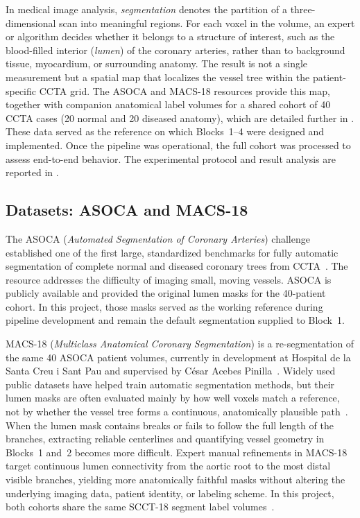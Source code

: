 In medical image analysis, \emph{segmentation} denotes the partition of a three-dimensional scan into meaningful regions. For each voxel in the volume, an expert or algorithm decides whether it belongs to a structure of interest, such as the blood-filled interior (\emph{lumen}) of the coronary arteries, rather than to background tissue, myocardium, or surrounding anatomy. The result is not a single measurement but a spatial map that localizes the vessel tree within the patient-specific CCTA grid. The ASOCA and MACS-18 resources provide this map, together with companion anatomical label volumes for a shared cohort of 40 CCTA cases (20 normal and 20 diseased anatomy), which are detailed further in . These data served as the reference on which Blocks~1--4 were designed and implemented. Once the pipeline was operational, the full cohort was processed to assess end-to-end behavior. The experimental protocol and result analysis are reported in .

\subsection{Datasets: ASOCA and MACS-18}
\label{subsec:datasets-asoca-macs}

The ASOCA (\emph{Automated Segmentation of Coronary Arteries}) challenge established one of the first large, standardized benchmarks for fully automatic segmentation of complete normal and diseased coronary trees from CCTA~\cite{gharleghi2022asoca}. The resource addresses the difficulty of imaging small, moving vessels. ASOCA is publicly available and provided the original lumen masks for the 40-patient cohort. In this project, those masks served as the working reference during pipeline development and remain the default segmentation supplied to Block~1.

MACS-18 (\emph{Multiclass Anatomical Coronary Segmentation}) is a re-segmentation of the same 40 ASOCA patient volumes, currently in development at Hospital de la Santa Creu i Sant Pau and supervised by C\'{e}sar Acebes Pinilla~\cite{acebes_macs18_wip,acebes2024}. Widely used public datasets have helped train automatic segmentation methods, but their lumen masks are often evaluated mainly by how well voxels match a reference, not by whether the vessel tree forms a continuous, anatomically plausible path~\cite{acebes_macs18_wip}. When the lumen mask contains breaks or fails to follow the full length of the branches, extracting reliable centerlines and quantifying vessel geometry in Blocks~1 and~2 becomes more difficult. Expert manual refinements in MACS-18 target continuous lumen connectivity from the aortic root to the most distal visible branches, yielding more anatomically faithful masks without altering the underlying imaging data, patient identity, or labeling scheme. In this project, both cohorts share the same SCCT-18 segment label volumes~\cite{leipsic2014}.

